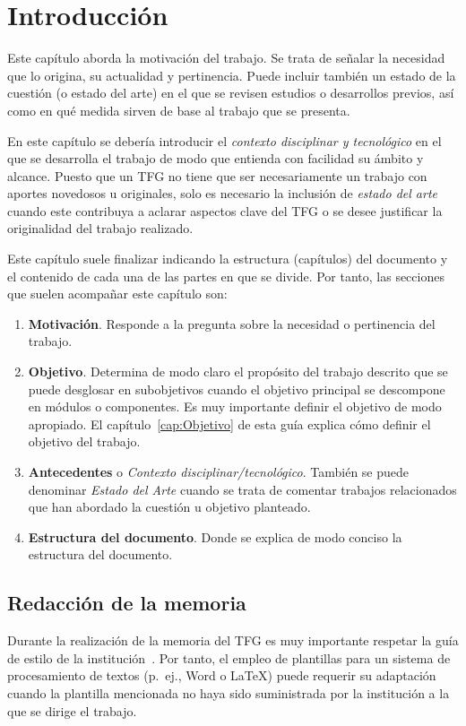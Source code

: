 \chapter{Introducción}
\label{cap:Introduccion}

Este capítulo aborda la motivación del trabajo. Se trata de señalar la necesidad que lo origina, su actualidad y pertinencia. Puede incluir también un estado de la cuestión (o estado del arte) en el que se revisen estudios o desarrollos previos, así como en qué medida sirven de base al trabajo que se presenta.

En este capítulo se debería introducir el \emph{contexto disciplinar y tecnológico} en el que se desarrolla el trabajo de modo que entienda con facilidad su ámbito y alcance. Puesto que un TFG no tiene que ser necesariamente un trabajo con aportes novedosos u originales, solo es necesario la inclusión de \emph{estado del arte} cuando este contribuya a aclarar aspectos clave del TFG o se desee justificar la originalidad del trabajo realizado.

Este capítulo suele finalizar indicando la estructura (capítulos) del documento y el contenido de cada una de las partes en que se divide. Por tanto, las secciones que suelen acompañar este capítulo son:
\begin{enumerate}
    \item \textbf{Motivación}. Responde a la pregunta sobre la necesidad o pertinencia del trabajo.
    \item \textbf{Objetivo}. Determina de modo claro el propósito del trabajo descrito que se puede desglosar en subobjetivos cuando el objetivo principal se descompone en módulos o componentes. Es muy importante definir el objetivo de modo apropiado. El capítulo~\ref{cap:Objetivo} de esta guía explica cómo definir el objetivo del trabajo.
    \item \textbf{Antecedentes} o \emph{Contexto disciplinar/tecnológico}. También se puede denominar \emph{Estado del Arte} cuando se trata de comentar trabajos relacionados que han abordado la cuestión u objetivo planteado.
    \item \textbf{Estructura del documento}. Donde se explica de modo conciso la estructura del documento.
\end{enumerate}


\section{Redacción de la memoria}
Durante la realización de la memoria del TFG es muy importante respetar la guía de estilo de la institución~\cite{esi19}. Por tanto, el empleo de plantillas para un sistema de procesamiento de textos (p.~ej., Word o \LaTeX) puede requerir su adaptación cuando la plantilla mencionada no haya sido suministrada por la institución a la que se dirige el trabajo.


